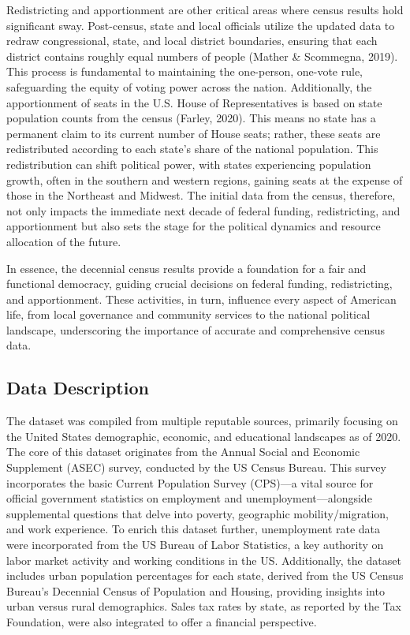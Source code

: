 \documentclass[
  12pt,
]{article}
\begin{document}
Redistricting and apportionment are other critical areas where census
results hold significant sway. Post-census, state and local officials
utilize the updated data to redraw congressional, state, and local
district boundaries, ensuring that each district contains roughly equal
numbers of people (Mather \& Scommegna, 2019). This process is
fundamental to maintaining the one-person, one-vote rule, safeguarding
the equity of voting power across the nation. Additionally, the
apportionment of seats in the U.S. House of Representatives is based on
state population counts from the census (Farley, 2020). This means no
state has a permanent claim to its current number of House seats;
rather, these seats are redistributed according to each state's share of
the national population. This redistribution can shift political power,
with states experiencing population growth, often in the southern and
western regions, gaining seats at the expense of those in the Northeast
and Midwest. The initial data from the census, therefore, not only
impacts the immediate next decade of federal funding, redistricting, and
apportionment but also sets the stage for the political dynamics and
resource allocation of the future.

In essence, the decennial census results provide a foundation for a fair
and functional democracy, guiding crucial decisions on federal funding,
redistricting, and apportionment. These activities, in turn, influence
every aspect of American life, from local governance and community
services to the national political landscape, underscoring the
importance of accurate and comprehensive census data.

\hypertarget{data-description}{%
\subsection{Data Description}\label{data-description}}

The dataset was compiled from multiple reputable sources, primarily
focusing on the United States demographic, economic, and educational
landscapes as of 2020. The core of this dataset originates from the
Annual Social and Economic Supplement (ASEC) survey, conducted by the US
Census Bureau. This survey incorporates the basic Current Population
Survey (CPS)---a vital source for official government statistics on
employment and unemployment---alongside supplemental questions that
delve into poverty, geographic mobility/migration, and work experience.
To enrich this dataset further, unemployment rate data were incorporated
from the US Bureau of Labor Statistics, a key authority on labor market
activity and working conditions in the US. Additionally, the dataset
includes urban population percentages for each state, derived from the
US Census Bureau's Decennial Census of Population and Housing, providing
insights into urban versus rural demographics. Sales tax rates by state,
as reported by the Tax Foundation, were also integrated to offer a
financial perspective.
\end{document}
